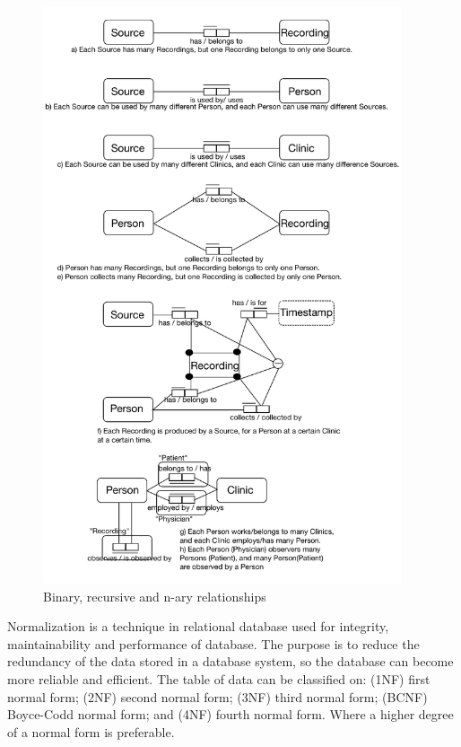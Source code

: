 \begin{figure}[ht]
    \centering
    \includegraphics[width=0.94\textwidth]{images/Group.png}
    \caption{Binary, recursive and n-ary relationships \cite{viet}}
    \label{fig:modelrelations}
\end{figure} 


Normalization is a technique in relational database used for integrity, maintainability and performance of database. The purpose is to reduce the redundancy of the data stored in a database system, so the database can become more reliable and efficient.  The table of data can be classified on: (1NF) first normal form; (2NF) second normal form; (3NF) third normal form; (BCNF) Boyce-Codd normal form; and (4NF) fourth normal form. Where a higher degree of a normal form is preferable.

